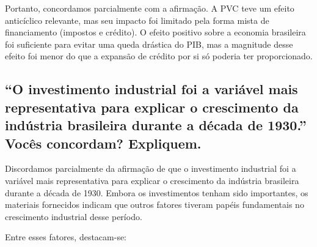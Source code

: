 \documentclass[a4paper,12pt]{article}[abntex2]
\begin{document}
Portanto, concordamos parcialmente com a afirmação. A PVC teve um efeito anticíclico relevante, mas seu impacto foi limitado pela forma mista de financiamento (impostos e crédito). O efeito positivo sobre a economia brasileira foi suficiente para evitar uma queda drástica do PIB, mas a magnitude desse efeito foi menor do que a expansão de crédito por si só poderia ter proporcionado.

\subsection{\textbf{“O investimento industrial foi a variável mais representativa para explicar o crescimento da indústria brasileira durante a década de 1930.” Vocês concordam? Expliquem. }}

Discordamos parcialmente da afirmação de que o investimento industrial foi a variável mais representativa para explicar o crescimento da indústria brasileira durante a década de 1930. Embora os investimentos tenham sido importantes, os materiais fornecidos indicam que outros fatores tiveram papéis fundamentais no crescimento industrial desse período. 

Entre esses fatores, destacam-se:
\end{document}
